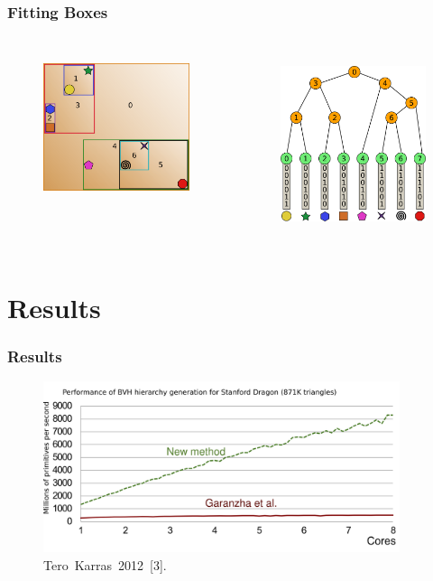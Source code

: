\documentclass{beamer}
\begin{document}
\begin{frame}
  \frametitle{Fitting Boxes}
  
\begin{columns}[t]

\begin{figure}
\includegraphics[height=45mm]{fit_4.png}
\end{figure}

\begin{figure}
\includegraphics[height=55mm]{radix_tree_bare.png}
\end{figure}
\end{columns}
\end{frame}


\section{Results}

\begin{frame}
  \frametitle{Results}
\begin{figure}
\includegraphics[height=50mm]{new_cores3.png}
\hspace{6pt}\hbox{\tiny{Tero Karras 2012 [3].}}
\end{figure}
\end{frame}
\end{document}
